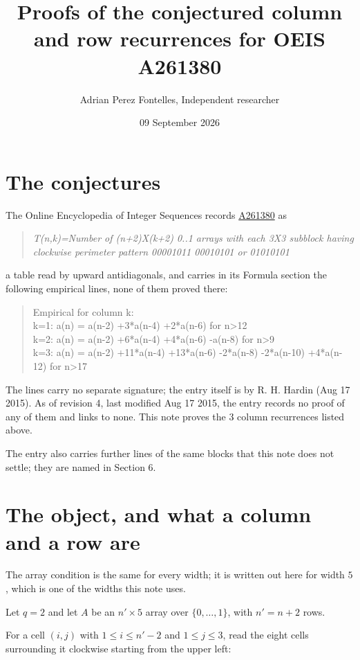 \documentclass[11pt]{article}
\title{Proofs of the conjectured column and row recurrences for OEIS A261380}
\author{Adrian Perez Fontelles, Independent researcher}
\date{09 September 2026}
\theoremstyle{definition}
\begin{document}
\maketitle
\section{The conjectures}

The Online Encyclopedia of Integer Sequences records \href{https://oeis.org/A261380}{A261380} as

\begin{quote}\itshape T(n,k)=Number of (n+2)X(k+2) 0..1 arrays with each 3X3 subblock having clockwise perimeter pattern 00001011 00010101 or 01010101\end{quote}

a table read by upward antidiagonals, and carries in its Formula section the following empirical lines, none of them proved there:

\begin{quote}\ttfamily Empirical for column k:\\
k=1: a(n) = a(n-2) +3*a(n-4) +2*a(n-6) for n>12\\k=2: a(n) = a(n-2) +6*a(n-4) +4*a(n-6) -a(n-8) for n>9\\k=3: a(n) = a(n-2) +11*a(n-4) +13*a(n-6) -2*a(n-8) -2*a(n-10) +4*a(n-12) for n>17\end{quote}

The lines carry no separate signature; the entry itself is by R. H. Hardin (Aug 17 2015). As of revision 4, last modified Aug 17 2015, the entry records no proof of any of them and links to none. This note proves the 3 column recurrences listed above.

The entry also carries further lines of the same blocks that this note does not settle; they are named in Section 6.

\section{The object, and what a column and a row are}

The array condition is the same for every width; it is written out here for width $5$, which is one of the widths this note uses.

Let $q = 2$ and let $A$ be an $n' \times 5$ array over $\{0,\dots,1\}$, with $n' = n + 2$ rows.

For a cell $(i,j)$ with $1 \le i \le n'-2$ and $1 \le j \le 3$, read the eight cells surrounding it clockwise starting from the upper left:
\end{document}

